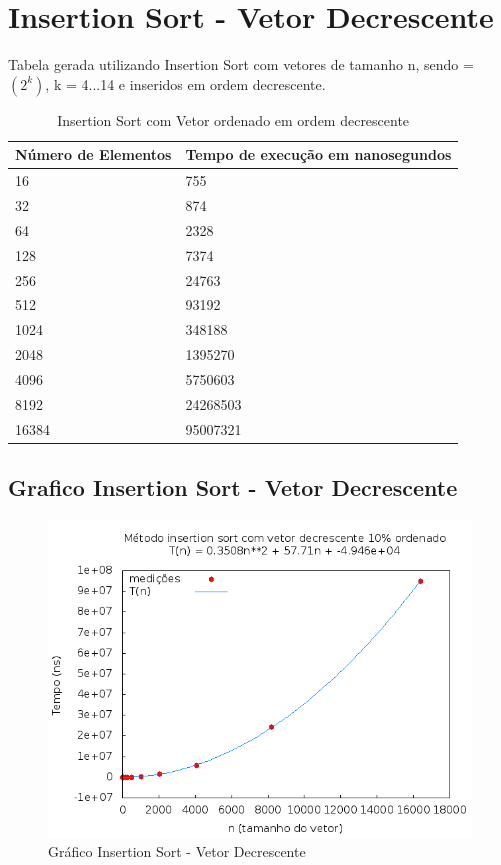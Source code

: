 \documentclass[12pt,a4paper,twoside]{report}
\begin{document}
\section{Insertion Sort - Vetor Decrescente}
Tabela gerada utilizando Insertion Sort com vetores de tamanho n, sendo = $(2^k)$, k = 4...14 e inseridos em ordem decrescente.

\begin{table}[H]
\centering
\caption{Insertion Sort com Vetor ordenado em ordem decrescente}
\label{my-label}
\begin{tabular}{|l|l|}
\hline
\multicolumn{1}{|c|}{\textbf{Número de Elementos}} & \multicolumn{1}{c|}{\textbf{Tempo de execução em nanosegundos}} \\ \hline
16 & 755 \\ \hline
32 & 874 \\ \hline
64 & 2328 \\ \hline
128 & 7374 \\ \hline
256 & 24763 \\ \hline
512 & 93192 \\ \hline
1024 & 348188 \\ \hline
2048 & 1395270 \\ \hline
4096 & 5750603 \\ \hline
8192 & 24268503 \\ \hline
16384 & 95007321 \\ \hline
\end{tabular}
\end{table}

\subsection{Grafico Insertion Sort - Vetor Decrescente}
\begin{figure}[H]
    \centering
    \includegraphics[width=0.7\linewidth]{graficos/Insertion/vIntDecrescente/vIntDecrescente.png}
  \caption{Gráfico Insertion Sort - Vetor Decrescente}
\end{figure}
\end{document}
